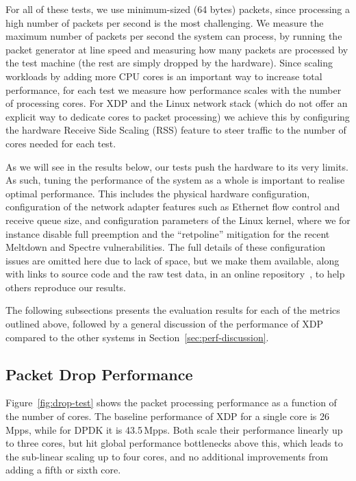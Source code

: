 \documentclass[10pt,sigconf]{acmart}
\begin{document}
For all of these tests, we use minimum-sized (64 bytes) packets, since
processing a high number of packets per second is the most challenging. We
measure the maximum number of packets per second the system can process, by
running the packet generator at line speed and measuring how many packets are
processed by the test machine (the rest are simply dropped by the hardware).
Since scaling workloads by adding more CPU cores is an important way to increase
total performance, for each test we measure how performance scales with the
number of processing cores. For XDP and the Linux network stack (which do not
offer an explicit way to dedicate cores to packet processing) we achieve this by
configuring the hardware Receive Side Scaling (RSS) feature to steer traffic to
the number of cores needed for each test.

As we will see in the results below, our tests push the hardware to its very
limits. As such, tuning the performance of the system as a whole is important to
realise optimal performance. This includes the physical hardware configuration,
configuration of the network adapter features such as Ethernet flow control and
receive queue size, and configuration parameters of the Linux kernel, where we
for instance disable full preemption and the ``retpoline'' mitigation for the
recent Meltdown and Spectre vulnerabilities. The full details of these
configuration issues are omitted here due to lack of space, but we make them
available, along with links to source code and the raw test data, in an online
repository~\cite{test-data}, to help others reproduce our results.

The following subsections presents the evaluation results for each of the
metrics outlined above, followed by a general discussion of the performance of
XDP compared to the other systems in Section~\ref{sec:perf-discussion}.

\subsection{Packet Drop Performance}
\label{sec:basel-pack-proc}
Figure~\ref{fig:drop-test} shows the packet processing performance as a function
of the number of cores. The baseline performance of XDP for a single core is
26\,Mpps, while for DPDK it is 43.5\,Mpps. Both scale their performance linearly
up to three cores, but hit global performance bottlenecks above this, which
leads to the sub-linear scaling up to four cores, and no additional improvements
from adding a fifth or sixth core.
\end{document}
